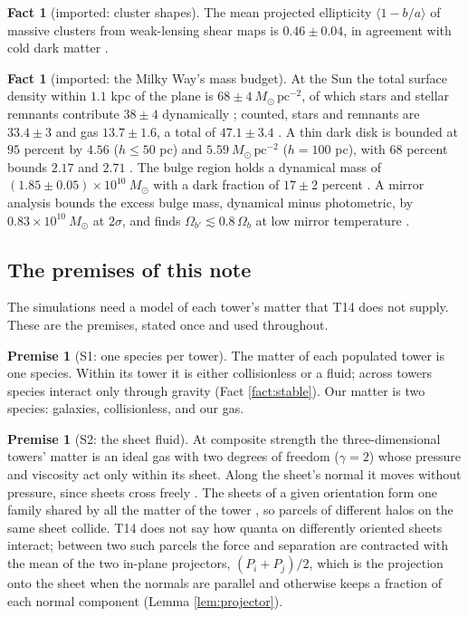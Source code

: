 \documentclass[11pt]{article}
\theoremstyle{definition}
\newtheorem{fact}[theorem]{Fact}
\newtheorem{premise}[theorem]{Premise}
\newcommand{\Msun}{M_{\odot}}
\begin{document}
\begin{fact}[imported: cluster shapes]\label{fact:oguri}
The mean projected ellipticity $\langle 1 - b/a\rangle$ of massive clusters from weak-lensing shear maps is $0.46 \pm 0.04$, in agreement with cold dark matter \cite{Oguri2010}.
\end{fact}

\begin{fact}[imported: the Milky Way's mass budget]\label{fact:mw}
At the Sun the total surface density within $1.1$ kpc of the plane is $68 \pm 4\ \Msun\,\mathrm{pc^{-2}}$, of which stars and stellar remnants contribute $38 \pm 4$ dynamically \cite{BovyRix2013}; counted, stars and remnants are $33.4 \pm 3$ and gas $13.7 \pm 1.6$, a total of $47.1 \pm 3.4$ \cite{McKee2015}. A thin dark disk is bounded at $95$ percent by $4.56$ ($h \le 50$ pc) and $5.59\ \Msun\,\mathrm{pc^{-2}}$ ($h = 100$ pc), with $68$ percent bounds $2.17$ and $2.71$ \cite{Widmark2021}. The bulge region holds a dynamical mass of $(1.85 \pm 0.05) \times 10^{10}\ \Msun$ with a dark fraction of $17 \pm 2$ percent \cite{Portail2017}. A mirror analysis bounds the excess bulge mass, dynamical minus photometric, by $0.83 \times 10^{10}\ \Msun$ at $2\sigma$, and finds $\Omega_{b'} \lesssim 0.8\,\Omega_{b}$ at low mirror temperature \cite{RouxCline2020}.
\end{fact}

\subsection{The premises of this note}

The simulations need a model of each tower's matter that T14 does not supply. These are the premises, stated once and used throughout.

\begin{premise}[S1: one species per tower]\label{prem:S1}
The matter of each populated tower is one species. Within its tower it is either collisionless or a fluid; across towers species interact only through gravity (Fact \ref{fact:stable}). Our matter is two species: galaxies, collisionless, and our gas.
\end{premise}

\begin{premise}[S2: the sheet fluid]\label{prem:S2}
At composite strength the three-dimensional towers' matter is an ideal gas with two degrees of freedom ($\gamma = 2$) whose pressure and viscosity act only within its sheet. Along the sheet's normal it moves without pressure, since sheets cross freely \cite[Rem.~7.30]{ButlerT14}. The sheets of a given orientation form one family shared by all the matter of the tower \cite[Lem.~6.1, Prem.~7.4]{ButlerT14}, so parcels of different halos on the same sheet collide. T14 does not say how quanta on differently oriented sheets interact; between two such parcels the force and separation are contracted with the mean of the two in-plane projectors, $(P_{i} + P_{j})/2$, which is the projection onto the sheet when the normals are parallel and otherwise keeps a fraction of each normal component (Lemma \ref{lem:projector}).
\end{premise}
\end{document}

